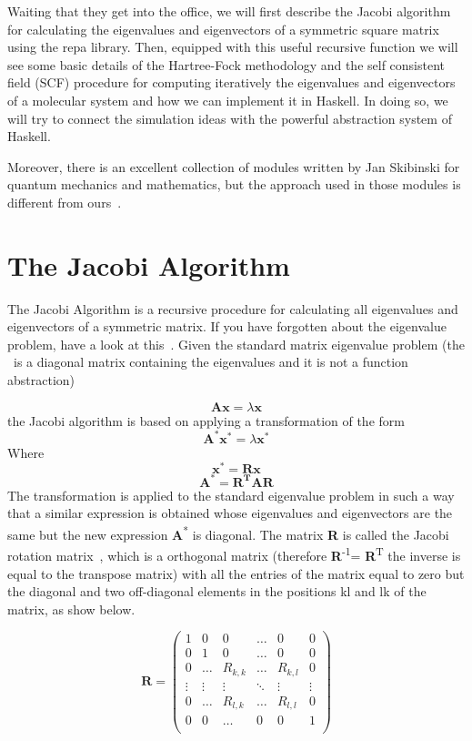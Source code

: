 \documentclass{tmr}
\begin{document}
Waiting that they get into the office, we will first describe 
the Jacobi algorithm for calculating the eigenvalues
and eigenvectors of a symmetric square matrix using the repa 
library. Then, equipped with this useful recursive function 
we will see some basic details of the Hartree-Fock methodology and
the self consistent field (SCF) procedure for computing iteratively the eigenvalues
and eigenvectors of a molecular system and how we can implement
it in Haskell. In doing so, we will try to connect the simulation ideas with 
the powerful abstraction system of Haskell.
\par Moreover, there is an excellent collection of modules written by 
Jan Skibinski for quantum mechanics and mathematics, but the approach used
in those modules is different from ours~\cite{Skibinski}.


\section{The Jacobi Algorithm}
The Jacobi Algorithm is a recursive procedure for calculating all eigenvalues
and eigenvectors of a symmetric matrix. If you have forgotten about the eigenvalue problem,
 have a look at this~\cite{eigenvalue}. Given the standard matrix eigenvalue problem 
(the \textlambda\ is a diagonal matrix containing the eigenvalues and it is not a function
abstraction)

\[\mathbf{Ax} = \lambda \mathbf{x}  \]
the Jacobi algorithm is based on applying a transformation of the form 
 \[\mathbf{A^*x^*} = \lambda \mathbf{x^*}  \]
Where
\[\mathbf{x^*} = \mathbf{Rx} \]
\[\mathbf{A^*} = \mathbf{R^TAR} \]
The transformation is applied to the standard eigenvalue problem
in such a way that a similar expression is obtained whose 
eigenvalues and eigenvectors are the same but the
new expression {\textbf A\textsuperscript{*}} is diagonal. The matrix {\bf R} 
is called the Jacobi rotation matrix~\cite{Jacobi},
which is a orthogonal matrix (therefore {\textbf R\textsuperscript{-1}}= {\textbf R\textsuperscript{T}} the
inverse is equal to the transpose matrix) with all the entries of the matrix equal
 to zero but the diagonal and two off-diagonal elements
in the positions kl and lk of the matrix, as show below.

\[
 \mathbf{R} =
\begin{pmatrix}
1 & 0 & 0 & \hdots & 0 & 0 \\
0 & 1 & 0 & \hdots & 0 & 0 \\
0 & \hdots & R_{k,k} & \hdots & R_{k,l} &  0 \\ 
\vdots & \vdots & \vdots & \ddots & \vdots & \vdots \\
0 &  \hdots & R_{l,k} & \hdots & R_{l,l} & 0 \\
0 & 0 & \hdots & 0 & 0 & 1 \\ 
\end{pmatrix}
\]
\end{document}
